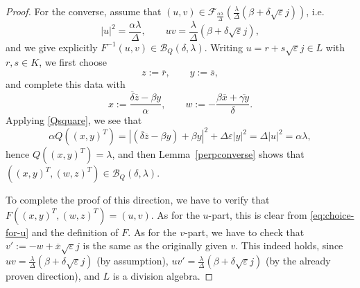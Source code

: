 \documentclass[10pt,a4paper]{amsart}
\begin{document}
\begin{proof}
For the converse, assume that $(u,v)\in \mathcal{F}_{\frac{\alpha\lambda}{\Delta}}\left(\frac{\lambda}{\Delta}(\beta+\delta\sqrt{\varepsilon}j)\right)$, i.e.
\[
|u|^2=\frac{\alpha\lambda}{\Delta},\qquad uv=\frac{\lambda}{\Delta}(\beta+\delta\sqrt{\varepsilon}j),
\]
and we give explicitly $F^{-1}(u,v)\in\mathcal B_Q(\delta,\lambda)$. Writing $u=r+s\sqrt{\varepsilon} j\in L$ with $r,s\in K$, we first choose
\begin{equation}\label{eq:choice-for-u}
z:= \overline{r},\qquad y:=\overline{s},
\end{equation}
and complete this data with
\[
x:=\frac{\overline{\delta}\overline{z}-\beta y}{\alpha},\qquad w:= - \frac{\beta\overline{x}+\overline{\gamma y}}{\delta}.
\]
Applying \eqref{Qsquare}, we see that
\[\alpha Q((x,y)^T)=|(\overline\delta\overline z-\beta y)+\beta y|^2+\Delta\varepsilon|y|^2=\Delta |u|^2=\alpha\lambda,\]
hence $Q((x,y)^T)=\lambda$, and then Lemma~\ref{perpconverse} shows that $((x,y)^T,(w,z)^T)\in\mathcal B_Q(\delta,\lambda)$.

To complete the proof of this direction, we have to verify that $F((x,y)^T,(w,z)^T)=(u,v)$. As for the $u$-part, this is clear from \eqref{eq:choice-for-u} and the definition of $F$. As for the $v$-part, we have to check that $v':=-w+\overline{x}\sqrt{\varepsilon}j$ is the same as the originally given $v$. This indeed holds, since $uv=\frac{\lambda}{\Delta}(\beta+\delta\sqrt{\varepsilon}j)$ (by assumption), $uv'=\frac{\lambda}{\Delta}(\beta+\delta\sqrt{\varepsilon}j)$ (by the already proven direction), and $L$ is a division algebra.
\end{proof}
\end{document}
